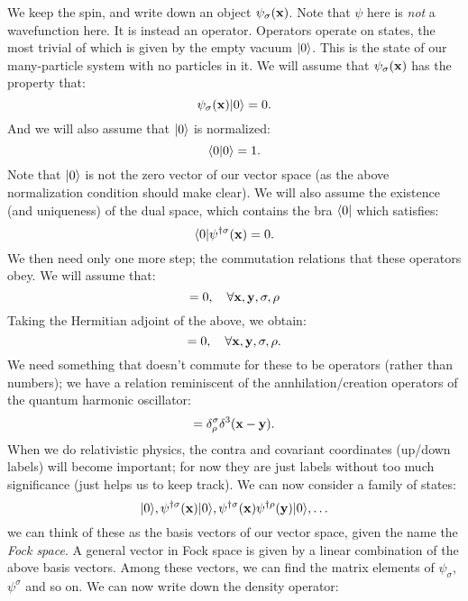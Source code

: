 We keep the spin, and write down an object $\psi_\sigma(\mathbf{x})$. Note that $\psi$ here is \emph{not} a wavefunction here. It is instead an operator. Operators operate on states, the most trivial of which is given by the empty vacuum $\lvert 0 \rangle$. This is the state of our many-particle system with no particles in it. We will assume that $\psi_\sigma(\mathbf{x})$ has the property that:
\begin{equation}
    \psi_\sigma(\mathbf{x})\lvert 0 \rangle = 0.
\end{equation}
And we will also assume that $\lvert 0 \rangle$ is normalized:
\begin{equation}
    \langle 0 \lvert 0 \rangle = 1.
\end{equation}
Note that $\lvert 0 \rangle$ is not the zero vector of our vector space (as the above normalization condition should make clear). We will also assume the existence (and uniqueness) of the dual space, which contains the bra $\langle 0 \rvert$ which satisfies:
\begin{equation}
    \langle 0 \rvert\psi^{\dagger\sigma}(\mathbf{x}) = 0.
\end{equation}
We then need only one more step; the commutation relations that these operators obey. We will assume that:
\begin{equation}
    [\psi_\sigma(\v{x}), \psi_{\rho}(\v{y})] = 0, \quad \forall \v{x}, \v{y}, \sigma, \rho
\end{equation}
Taking the Hermitian adjoint of the above, we obtain:
\begin{equation}
    [\psi^{\dag\sigma}(\v{x}), \psi^{\dag\rho}(\v{y})] = 0, \quad \forall \v{x}, \v{y}, \sigma, \rho.
\end{equation}
We need something that doesn't commute for these to be operators (rather than numbers); we have a relation reminiscent of the annhilation/creation operators of the quantum harmonic oscillator:
\begin{equation}
    [\psi_\sigma(\v{x}), \psi^{\dag\rho}(\v{y})] = \delta_\rho^\sigma \delta^3(\v{x} - \v{y}).
\end{equation}
When we do relativistic physics, the contra and covariant coordinates (up/down labels) will become important; for now they are just labels without too much significance (just helps us to keep track). We can now consider a family of states:
\begin{equation}
    \lvert 0 \rangle, \psi^{\dagger\sigma}(\mathbf{x})\lvert 0 \rangle, \psi^{\dagger\sigma}(\mathbf{x})\psi^{\dagger\rho}(\mathbf{y})\lvert 0 \rangle, \ldots
\end{equation}
we can think of these as the basis vectors of our vector space, given the name the \emph{Fock space}. A general vector in Fock space is given by a linear combination of the above basis vectors. Among these vectors, we can find the matrix elements of $\psi_\sigma$, $\psi^{\sigma}$ and so on. We can now write down the density operator:
